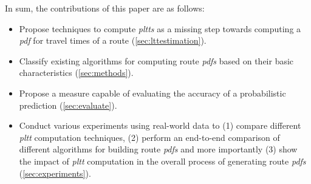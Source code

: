 In sum, the contributions of this paper are as follows:
\begin{itemize}
\item Propose techniques to compute \textit{pltts} as a missing step towards computing a \textit{pdf} for travel times of a route (\cref{sec:lttestimation}).
\item Classify existing algorithms for computing route \textit{pdfs} based on their basic characteristics (\cref{sec:methods}).
\item Propose a measure capable of evaluating the accuracy of a probabilistic prediction (\cref{sec:evaluate}).
\item Conduct various experiments using real-world data to (1) compare different \textit{pltt} computation techniques, (2) perform an end-to-end comparison of different algorithms for building route \textit{pdfs} and more importantly (3) show the impact of \textit{pltt} computation in the overall process of generating route \textit{pdfs} (\cref{sec:experiments}).
\end{itemize} 


